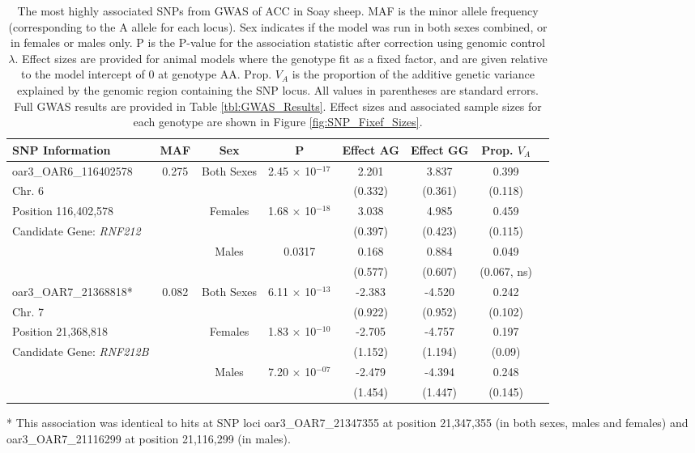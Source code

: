 \documentclass[a4paper,11pt]{article}
\begin{document}
\begin{table}[H]
	\captionsetup{width=.9\textwidth}
	\caption{The most highly associated SNPs from GWAS of ACC in Soay sheep. MAF is the minor allele frequency (corresponding to the A allele for each locus). Sex indicates if the model was run in both sexes combined, or in females or males only. P is the P-value for the association statistic after correction using genomic control $\lambda$. Effect sizes are provided for animal models where the genotype fit as a fixed factor, and are given relative to the model intercept of 0 at genotype AA. Prop. $V_{A}$ is the proportion of the additive genetic variance explained by the genomic region containing the SNP locus. All values in parentheses are standard errors. Full GWAS results are provided in Table \ref{tbl:GWAS_Results}. Effect sizes and associated sample sizes for each genotype are shown in Figure \ref{fig:SNP_Fixef_Sizes}.}
	\small
	\centering
	\setlength{\extrarowheight}{.5em}
	\begin{tabular}{lccccccc}
		
		\hline
		
		SNP Information        &	MAF	&	Sex	&	P	&	Effect AG	&	Effect GG	&	Prop. $V_{A}$	\\ \hline
		oar3\_OAR6\_116402578	&	0.275	&	Both Sexes	&	2.45 $\times$ 10$^{-17}$	&	2.201	&	3.837	&	0.399	\\
		Chr. 6           	&		&		&		&	(0.332)	&	(0.361)	& (0.118) \\
		Position 116,402,578	&		&	Females	&	1.68 $\times$ 10$^{-18}$	&	3.038	&	4.985	&	0.459	\\
		Candidate Gene: \textit{RNF212} &		&		&		&	(0.397)	&	(0.423)	&	(0.115)	\\
		&		&	Males	&	0.0317	&	0.168	&	0.884	&	0.049	\\
		&		&		&		&	(0.577)	&	(0.607)	&	(0.067, ns)	\\ \hline
		oar3\_OAR7\_21368818*	&	0.082	&	Both Sexes	&	6.11 $\times$ 10$^{-13}$	&	-2.383	&	-4.520	&	0.242\\
		Chr. 7	            &		&		&		&	(0.922)	&	(0.952)	&	(0.102)	\\
		Position 21,368,818	&		&	Females	&	1.83 $\times$ 10$^{-10}$	&	-2.705	&	-4.757	&	0.197	\\
		Candidate Gene: \textit{RNF212B} &		&		&		&	(1.152)	&	(1.194)	&	(0.09)	\\
		&		&	Males	&	7.20 $\times$ 10$^{-07}$	&	-2.479	&	-4.394	&	0.248	\\
		&		&		&		&	(1.454)	&	(1.447)	&	(0.145)	\\
		
		\hline
		
	\end{tabular}
\vspace{0.2cm}

* This association was identical to hits at SNP loci oar3\_OAR7\_21347355 at position 21,347,355 (in both sexes, males and females) and oar3\_OAR7\_21116299 at position 21,116,299 (in males).
	\label{tbl:GWAS_Top_SNPs}
\end{table}
\end{document}
